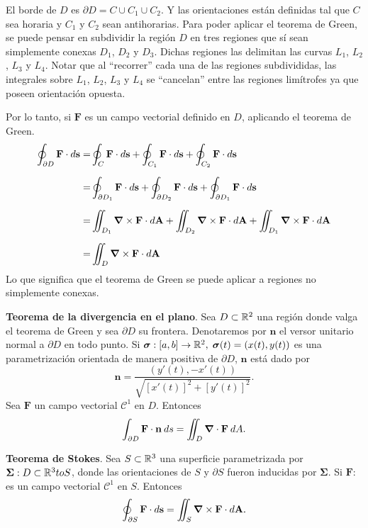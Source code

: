 \begin{obs}
    El borde de $D$ es $\partial D=C\cup C_1\cup C_2$. Y las orientaciones est\'an definidas tal que $C$ sea horaria y $C_1$ y $C_2$ sean antihorarias. Para poder aplicar el teorema de Green, se puede pensar en subdividir la regi\'on $D$ en tres regiones que s\'i sean simplemente conexas $D_1$, $D_2$ y $D_3$. Dichas regiones las delimitan las curvas $L_1$, $L_2$, $L_3$ y $L_4$. Notar que al ``recorrer'' cada una de las regiones subdivididas, las integrales sobre $L_1$, $L_2$, $L_3$ y $L_4$ se ``cancelan'' entre las regiones lim\'itrofes ya que poseen orientación opuesta. 
    
    Por lo tanto, si $\mathbf{F}$ es un campo vectorial definido en $D$, aplicando el teorema de Green.
    \begin{align*}
        \oint_{\partial D} \mathbf{F}\cdot d\mathbf{s}=&\oint_{C}\mathbf{F}\cdot d\mathbf{s}+\oint_{C_1}\mathbf{F}\cdot d\mathbf{s}+\oint_{C_2}\mathbf{F}\cdot d\mathbf{s}\\[.2cm]
        =&\oint_{\partial D_1}\mathbf{F}\cdot d\mathbf{s}+\oint_{\partial D_2}\mathbf{F}\cdot d\mathbf{s}+\oint_{\partial D_1}\mathbf{F}\cdot d\mathbf{s}\\[.2cm]
        =&\iint_{ D_1}\grad\times\mathbf{F}\cdot d\mathbf{A}+\iint_{ D_2}\grad\times\mathbf{F}\cdot d\mathbf{A}+\iint_{ D_1}\grad\times\mathbf{F}\cdot d\mathbf{A}\\[.2cm]
        =&\iint_D \grad\times\mathbf{F}\cdot d\mathbf{A}
    \end{align*}
    Lo que significa que el teorema de Green se puede aplicar a regiones no simplemente conexas.
\end{obs}

\begin{theorem}
\textbf{Teorema de la divergencia en el plano}. Sea $D\subset\mathbb{R}^2$ una regi\'on donde valga el teorema de Green y sea $\partial D$ su frontera. Denotaremos por $\mathbf{n}$ el versor unitario normal a $\partial D$ en todo punto. Si $\boldsymbol{\sigma}:[a,b]\to\mathbb{R}^2,\;\boldsymbol{\sigma}(t)=(x(t),y(t))$ es una parametrizaci\'on orientada de manera positiva de $\partial D$, $\mathbf{n}$ est\'a dado por 
\[
    \mathbf{n}=\frac{(y'(t),-x'(t))}{\sqrt{[x'(t)]^2+[y'(t)]^2}}.
\]
Sea $\mathbf{F}$ un campo vectorial $\mathcal{C}^1$ en $D$. Entonces
\[
    \int_{\partial D}\mathbf{F}\cdot\mathbf{n}\:ds=\iint_D\grad\cdot\mathbf{F}\:dA.
\]
\end{theorem}

\begin{theorem}
\textbf{Teorema de Stokes}. Sea $S\subset\mathbb{R}^3$ una superficie parametrizada por $\boldsymbol{\Sigma}:D\subset\mathbb{R}^3to S$, donde las orientaciones de $S$ y $\partial S$ fueron inducidas por $\boldsymbol{\Sigma}$. Si $\mathbf{F}:$ es un campo vectorial $\mathcal{C}^1$ en $S$. Entonces
\[
    \oint_{\partial S}\mathbf{F}\cdot d\mathbf{s}=\iint_S\grad\times\mathbf{F}\cdot d\mathbf{A}.
\]
\end{theorem}

